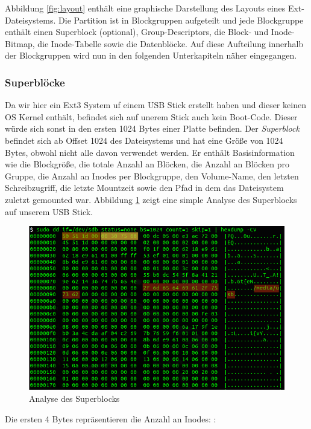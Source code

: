 Abbildung \ref{fig:layout} enthält eine graphische Darstellung des Layouts eines Ext-Dateisystems. Die Partition ist in Blockgruppen aufgeteilt und jede Blockgruppe enthält einen Superblock (optional), Group-Descriptors, die Block- und Inode-Bitmap, die Inode-Tabelle sowie die Datenblöcke. Auf diese Aufteilung innerhalb der Blockgruppen wird nun in den folgenden Unterkapiteln näher eingegangen.

\subsubsection{Superblöcke}

Da wir hier ein Ext3 System uf einem USB Stick erstellt haben und dieser keinen OS Kernel enthält, befindet sich auf unerem Stick auch kein Boot-Code. Dieser würde sich sonst in den ersten 1024 Bytes einer Platte befinden. Der \textit{Superblock} befindet sich ab Offset 1024 des Dateisystems und hat eine Größe von 1024 Bytes, obwohl nicht alle davon verwendet werden. Er enthält Basisinformation wie die Blockgröße, die totale Anzahl an Blöcken, die Anzahl an Blöcken pro Gruppe, die Anzahl an Inodes per Blockgruppe, den Volume-Name, den letzten Schreibzugriff, die letzte Mountzeit sowie den Pfad in dem das Dateisystem zuletzt gemounted war. Abbildung \ref{fig:superblock} zeigt eine simple Analyse des Superblocks auf unserem USB Stick.

\begin{figure}[H]
	\centering
	\includegraphics[width=12cm,keepaspectratio=true]{pictures/superblock.png}
	\caption{
		Analyse des Superblocks
	}
	\label{fig:superblock}
\end{figure}

Die ersten 4 Bytes repräsentieren die Anzahl an Inodes: \cite{Ext2.07.01.2022}:

